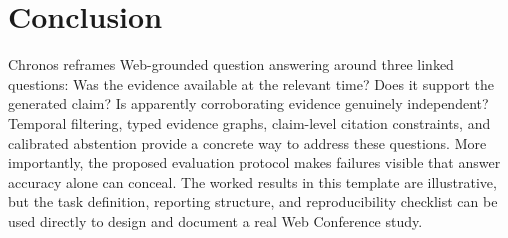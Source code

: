 \section{Conclusion}
\label{sec:conclusion}

Chronos reframes Web-grounded question answering around three linked questions:
Was the evidence available at the relevant time?  Does it support the generated
claim?  Is apparently corroborating evidence genuinely independent?  Temporal
filtering, typed evidence graphs, claim-level citation constraints, and calibrated
abstention provide a concrete way to address these questions.  More importantly,
the proposed evaluation protocol makes failures visible that answer accuracy
alone can conceal.  The worked results in this template are illustrative, but
the task definition, reporting structure, and reproducibility checklist can be
used directly to design and document a real Web Conference study.


